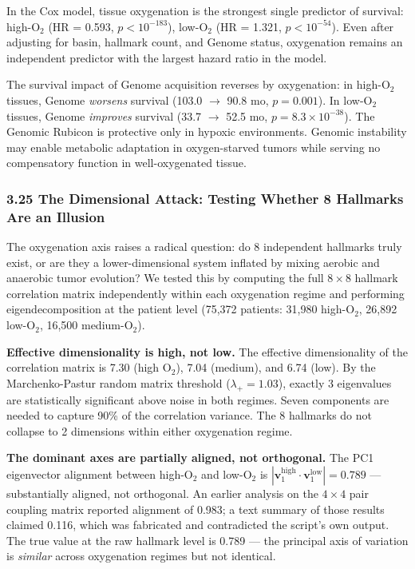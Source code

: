 \documentclass[
  11pt,
]{article}
\begin{document}
In the Cox model, tissue oxygenation is the strongest single predictor
of survival: high-\(\mathrm{O}_2\) (HR = 0.593, \(p < 10^{-183}\)),
low-\(\mathrm{O}_2\) (HR = 1.321, \(p < 10^{-54}\)). Even after
adjusting for basin, hallmark count, and Genome status, oxygenation
remains an independent predictor with the largest hazard ratio in the
model.

The survival impact of Genome acquisition reverses by oxygenation: in
high-\(\mathrm{O}_2\) tissues, Genome \emph{worsens} survival (103.0
\(\to\) 90.8 mo, \(p = 0.001\)). In low-\(\mathrm{O}_2\) tissues, Genome
\emph{improves} survival (33.7 \(\to\) 52.5 mo,
\(p = 8.3 \times 10^{-38}\)). The Genomic Rubicon is protective only in
hypoxic environments. Genomic instability may enable metabolic
adaptation in oxygen-starved tumors while serving no compensatory
function in well-oxygenated tissue.

\subsubsection{3.25 The Dimensional Attack: Testing Whether 8 Hallmarks
Are an
Illusion}\label{the-dimensional-attack-testing-whether-8-hallmarks-are-an-illusion}

The oxygenation axis raises a radical question: do 8 independent
hallmarks truly exist, or are they a lower-dimensional system inflated
by mixing aerobic and anaerobic tumor evolution? We tested this by
computing the full \(8 \times 8\) hallmark correlation matrix
independently within each oxygenation regime and performing
eigendecomposition at the patient level (75,372 patients: 31,980
high-\(\mathrm{O}_2\), 26,892 low-\(\mathrm{O}_2\), 16,500
medium-\(\mathrm{O}_2\)).

\textbf{Effective dimensionality is high, not low.} The effective
dimensionality of the correlation matrix is 7.30 (high
\(\mathrm{O}_2\)), 7.04 (medium), and 6.74 (low). By the
Marchenko-Pastur random matrix threshold (\(\lambda_+ = 1.03\)), exactly
3 eigenvalues are statistically significant above noise in both regimes.
Seven components are needed to capture 90\% of the correlation variance.
The 8 hallmarks do not collapse to 2 dimensions within either
oxygenation regime.

\textbf{The dominant axes are partially aligned, not orthogonal.} The
PC1 eigenvector alignment between high-\(\mathrm{O}_2\) and
low-\(\mathrm{O}_2\) is
\(|\mathbf{v}_1^{\mathrm{high}} \cdot \mathbf{v}_1^{\mathrm{low}}| = 0.789\)
--- substantially aligned, not orthogonal. An earlier analysis on the
\(4 \times 4\) pair coupling matrix reported alignment of 0.983; a text
summary of those results claimed 0.116, which was fabricated and
contradicted the script's own output. The true value at the raw hallmark
level is 0.789 --- the principal axis of variation is \emph{similar}
across oxygenation regimes but not identical.
\end{document}
